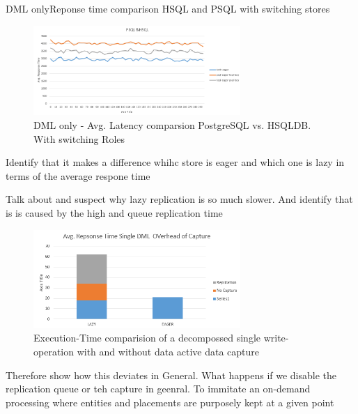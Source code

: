DML onlyReponse time comparison HSQL and PSQL with switching stores
\begin{figure}[t] 
    \centering 
    \includegraphics[width=0.7\textwidth]{Figures/PSQ_HSQL_DML_only.PNG}
    \caption{DML only - Avg. Latency comparsion PostgreSQL vs. HSQLDB. With switching Roles}
    \label{fig:psqlhsqlresponse}
\end{figure}



Identify that it makes a difference whihc store is eager and which one is lazy in terms of the  average respone time

Talk about and suspect why lazy replication is so much slower.
And identify that is is caused by the high and queue replication time
\begin{figure}[t] 
    \centering 
    \includegraphics[width=0.7\textwidth]{Figures/dml_comp.PNG}
    \caption{Execution-Time comparision of a decompossed  single write-operation with and without data active data capture }
    \label{fig:write_decomposition}
\end{figure}

Therefore show how this deviates in General. What happens if we disable the replication queue or teh capture in geenral.
To immitate an on-demand processing where entities and placements are purposely kept at a given point

